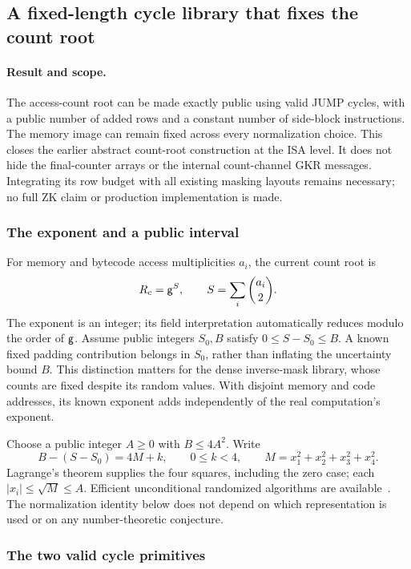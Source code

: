 \subsection{A fixed-length cycle library that fixes the count root}\label{note:zk-count-root}

\paragraph{Result and scope.} The access-count root can be made exactly public using valid JUMP cycles, with a public number of added rows and a constant number of side-block instructions. The memory image can remain fixed across every normalization choice. This closes the earlier abstract count-root construction at the ISA level. It does not hide the final-counter arrays or the internal count-channel GKR messages. Integrating its row budget with all existing masking layouts remains necessary; no full ZK claim or production implementation is made.

\subsubsection{The exponent and a public interval}

For memory and bytecode access multiplicities $a_i$, the current count root is
\[
 R_c=\mathsf{g}^S,\qquad S=\sum_i\binom{a_i}{2}.
\]
The exponent is an integer; its field interpretation automatically reduces modulo the order of $\mathsf{g}$. Assume public integers $S_0,B$ satisfy $0\le S-S_0\le B$. A known fixed padding contribution belongs in $S_0$, rather than inflating the uncertainty bound $B$. This distinction matters for the dense inverse-mask library, whose counts are fixed despite its random values. With disjoint memory and code addresses, its known exponent adds independently of the real computation's exponent.

Choose a public integer $A\ge0$ with $B\le4A^2$. Write
\[
 B-(S-S_0)=4M+k,\qquad 0\le k<4,
 \qquad M=x_1^2+x_2^2+x_3^2+x_4^2.
\]
Lagrange's theorem supplies the four squares, including the zero case; each $|x_i|\le\sqrt M\le A$. Efficient unconditional randomized algorithms are available~\cite{pt}. The normalization identity below does not depend on which representation is used or on any number-theoretic conjecture.

\subsubsection{The two valid cycle primitives}

